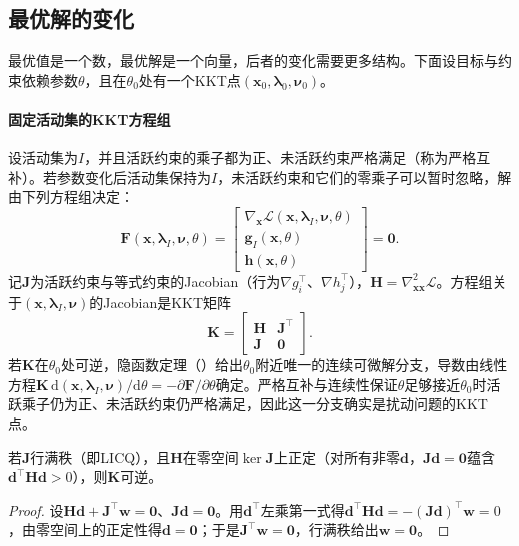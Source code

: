 \subsection{最优解的变化}
\label{sec:opt-con-solution-sensitivity}

最优值是一个数，最优解是一个向量，后者的变化需要更多结构。下面设目标与约束依赖参数$\theta$，且在$\theta_0$处有一个KKT点$(\bm x_0,\bm\lambda_0,\bm\nu_0)$。

\paragraph{固定活动集的KKT方程组}
设活动集为$I$，并且活跃约束的乘子都为正、未活跃约束严格满足（称为严格互补）。若参数变化后活动集保持为$I$，未活跃约束和它们的零乘子可以暂时忽略，解由下列方程组决定：
\[
  \bm F(\bm x,\bm\lambda_I,\bm\nu,\theta)=
  \begin{bmatrix}
    \nabla_{\bm x}\mathcal L(\bm x,\bm\lambda_I,\bm\nu,\theta)\\
    \bm g_I(\bm x,\theta)\\
    \bm h(\bm x,\theta)
  \end{bmatrix}=\bm0.
\]
记$\bm J$为活跃约束与等式约束的Jacobian（行为$\nabla g_i^\top$、$\nabla h_j^\top$），$\bm H=\nabla^2_{\bm x\bm x}\mathcal L$。方程组关于$(\bm x,\bm\lambda_I,\bm\nu)$的Jacobian是KKT矩阵
\begin{equation}
\label{eq:opt-con-kkt-matrix}
  \bm K=\begin{bmatrix}\bm H&\bm J^\top\\\bm J&\bm0\end{bmatrix}.
\end{equation}
若$\bm K$在$\theta_0$处可逆，隐函数定理（）给出$\theta_0$附近唯一的连续可微解分支，导数由线性方程$\bm K\,\mathrm d(\bm x,\bm\lambda_I,\bm\nu)/\mathrm d\theta=-\partial\bm F/\partial\theta$确定。严格互补与连续性保证$\theta$足够接近$\theta_0$时活跃乘子仍为正、未活跃约束仍严格满足，因此这一分支确实是扰动问题的KKT点。

\begin{lemma}[KKT矩阵可逆的充分条件]
\label{lem:opt-con-kkt-matrix}
若$\bm J$行满秩（即LICQ），且$\bm H$在零空间$\ker\bm J$上正定（对所有非零$\bm d$，$\bm J\bm d=\bm0$蕴含$\bm d^\top\bm H\bm d>0$），则$\bm K$可逆。
\end{lemma}

\begin{proof}
设$\bm H\bm d+\bm J^\top\bm w=\bm0$、$\bm J\bm d=\bm0$。用$\bm d^\top$左乘第一式得$\bm d^\top\bm H\bm d=-(\bm J\bm d)^\top\bm w=0$，由零空间上的正定性得$\bm d=\bm0$；于是$\bm J^\top\bm w=\bm0$，行满秩给出$\bm w=\bm0$。
\end{proof}

